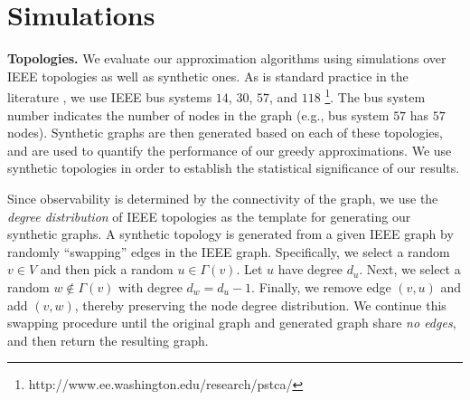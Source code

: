 \section{Simulations}
\label{sec:simulations}

\textbf{Topologies.} We evaluate our approximation algorithms using simulations over IEEE topologies as well as synthetic ones. 
As is standard practice in the literature \cite{Baldwin93,Abur06,Mili90,Xu04}, we use IEEE bus systems $14$, $30$, $57$, and $118$
{\footnote {\small http://www.ee.washington.edu/research/pstca/}}.  The bus system number indicates the number of nodes in the graph (e.g., bus system $57$ has $57$ nodes).
Synthetic graphs are then generated based on each of these topologies, and are used to quantify the performance of our greedy approximations.  
We use synthetic topologies in order to establish the statistical significance of our results.

Since observability is determined by the connectivity of the graph, we use the {\em degree distribution} of IEEE topologies as the template for generating our synthetic graphs.
A synthetic topology is generated from a given IEEE graph by randomly ``swapping'' edges in the IEEE graph. Specifically, we select a random $v \in V$ and then pick a random $u \in \Gamma(v)$. 
Let $u$ have degree $d_u$.  Next, we select a random $w \notin \Gamma(v)$ with degree $d_w = d_u -1$. %
Finally, we remove edge $(v,u)$ and add $(v,w)$, thereby preserving the node degree distribution.
We continue this swapping procedure until the original graph and generated graph share {\em no edges}, and then return the resulting graph.

